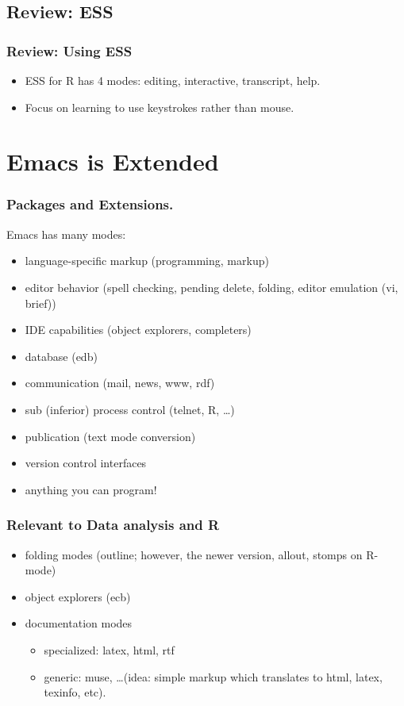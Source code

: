 \documentclass{beamer}
\begin{document}
\subsection{Review: ESS}

\begin{frame}
  \frametitle{Review: Using ESS}
  \begin{itemize}
  \item ESS for R has 4 modes: editing, interactive, transcript, help.
  \item Focus on learning to use keystrokes rather than mouse.
  \end{itemize}
\end{frame}

\section{Emacs is Extended}

\begin{frame}
  \frametitle{Packages and Extensions.}
  Emacs has many modes: 
  \begin{itemize}
  \item language-specific markup (programming, markup)
  \item editor behavior (spell checking, pending delete, folding,
    editor emulation (vi, brief))
  \item IDE capabilities (object explorers, completers)
  \item database (edb)
  \item communication (mail, news, www, rdf)
  \item sub (inferior) process control (telnet, R, \ldots)
  \item publication (text mode conversion)
  \item version control interfaces
  \item anything you can program!    
  \end{itemize}
\end{frame}

\begin{frame}
  \frametitle{Relevant to Data analysis and R}
  \begin{itemize}
  \item folding modes (outline; however, the newer version, allout,
    stomps on R-mode)
  \item object explorers (ecb)
  \item documentation modes
    \begin{itemize}
    \item specialized:  latex, html, rtf
    \item generic: muse, \ldots (idea: simple markup which translates to
      html, latex, texinfo, etc).
    \end{itemize}
  \end{itemize}
\end{frame}
\end{document}
